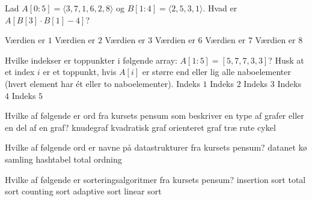\multiplechoicestart


Lad \(A[0:5] = \langle 3, 7, 1, 6, 2, 8 \rangle\) og \(B[1:4] = \langle 2, 5, 3, 1 \rangle\).
Hvad er \(A[B[3] \cdot B[1] - 4]\)?
\etsvar

\mulighederstart
\svar Værdien er \(1\) \korrekt
\svar Værdien er \(2\)
\svar Værdien er \(3\)
\svar Værdien er \(6\)
\svar Værdien er \(7\)
\svar Værdien er \(8\)
\mulighederslut
{}

Hvilke indekser er toppunkter i følgende array: \(A[1:5] = [5,7,7,3,3]\)?
Husk at et index \(i\) er et toppunkt, hvis \(A[i]\) er større end eller lig alle naboelementer (hvert element har ét eller to naboelementer).
\fleresvar
\mulighederstart
\svar Indeks \(1\)
\svar Indeks \(2\) \korrekt
\svar Indeks \(3\) \korrekt
\svar Indeks \(4\)
\svar Indeks \(5\) \korrekt
\mulighederslut
{}


Hvilke af følgende er ord fra kursets pensum som beskriver en type af grafer eller en del af en graf?
\fleresvar
\mulighederstart
\svar knudegraf
\svar kvadratisk graf
\svar orienteret graf \korrekt
\svar træ \korrekt
\svar rute
\svar cykel \korrekt
\mulighederslut
{}


Hvilke af følgende ord er navne på datastrukturer fra kursets pensum?
\fleresvar
\mulighederstart
\svar datanet
\svar kø \korrekt
\svar samling
\svar hashtabel \korrekt
\svar total ordning
\mulighederslut
{}

Hvilke af følgende er sorteringsalgoritmer fra kursets pensum?
\fleresvar
\mulighederstart
\svar insertion sort \korrekt
\svar total sort
\svar counting sort \korrekt
\svar adaptive sort
\svar linear sort
\mulighederslut
{}

